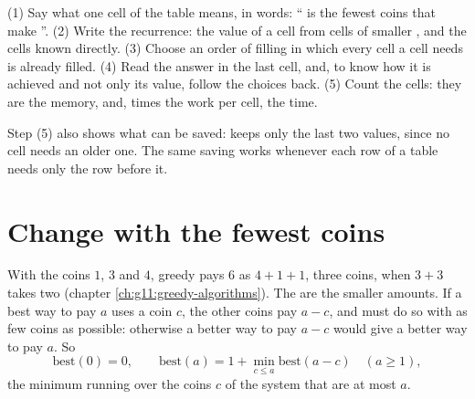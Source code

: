 \label{lst:g12:dynamic-programming:fib-table}

\label{out:g12:dynamic-programming:fib-table}

\begin{method}\label{met:g12:dynamic-programming:design}
(1) Say what one cell of the table means, in words: `` is the fewest coins that make ''.
(2) Write the recurrence: the value of a cell from cells of smaller , and the cells known directly.
(3) Choose an order of filling in which every cell a cell needs is already filled. (4) Read the answer in the last
cell, and, to know how it is achieved and not only its value, follow the choices back. (5) Count the cells: they are
the memory, and, times the work per cell, the time.
\end{method}

Step (5) also shows what can be saved:  keeps only the last two values, since no cell needs an older
one. The same saving works whenever each row of a table needs only the row before it.

\section{Change with the fewest coins}\label{sec:g12:dynamic-programming:change}

With the coins $1$, $3$ and $4$, greedy pays $6$ as $4 + 1 + 1$, three coins, when $3 + 3$ takes two (chapter
\ref{ch:g11:greedy-algorithms}). The  are the smaller amounts. If a best way to pay $a$ uses a coin $c$,
the other coins pay $a - c$, and must do so with as few coins as possible: otherwise a better way to pay $a - c$
would give a better way to pay $a$. So
\[
\mathrm{best}(0) = 0, \qquad \mathrm{best}(a) = 1 + \min_{c \le a} \mathrm{best}(a - c) \quad (a \ge 1),
\]
the minimum running over the coins $c$ of the system that are at most $a$.

\label{lst:g12:dynamic-programming:change}

